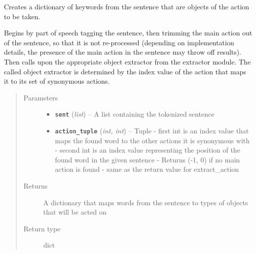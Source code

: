 \documentclass[letterpaper,10pt,english]{sphinxmanual}
\begin{document}
\begin{fulllineitems}
\label{interpreter:interpreter.interpreter.generate_object_dict}
Creates a dictionary of keywords from the sentence that are objects of the action to be taken.

Begins by part of speech tagging the sentence, then trimming the main action out of the sentence, so that it is not re-processed (depending on implementation details, the presence of the main action in the sentence may throw off results). Then calls upon the appropriate object extractor from the extractor module. The called object extractor is determined by the index value of the action that maps it to its set of synonymous actions.
\begin{quote}\begin{description}
\item[{Parameters}] \leavevmode\begin{itemize}
\item {} 
\textbf{\texttt{sent}} (\emph{list}) -- A list containing the tokenized sentence

\item {} 
\textbf{\texttt{action\_tuple}} (\emph{int, int}) -- Tuple - first int is an index value that maps the found word to the other actions it is synonymous with - second int is an index value representing the position of the found word in the given sentence - Returns (-1, 0) if no main action is found - same as the return value for extract\_action

\end{itemize}

\item[{Returns}] \leavevmode
A dictionary that maps words from the sentence to types of objects that will be acted on

\item[{Return type}] \leavevmode
dict

\end{description}\end{quote}

\end{fulllineitems}

\end{document}
